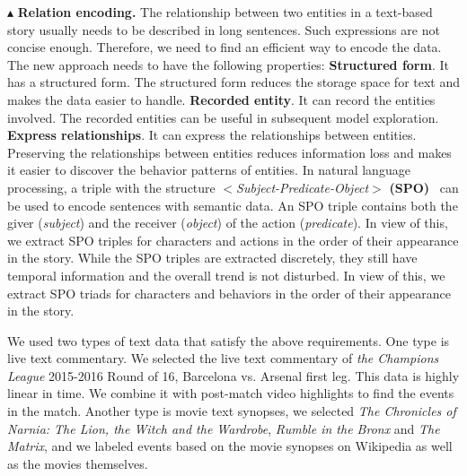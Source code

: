 \documentclass[review,journal]{vgtc}         %
\begin{document}
$\blacktriangle$ \textbf{Relation encoding.} The relationship between two entities in a text-based story usually needs to be described in long sentences. Such expressions are not concise enough. Therefore, we need to find an efficient way to encode the data. The new approach needs to have the following properties:  \textbf{Structured form}. It has a structured form. The structured form reduces the storage space for text and makes the data easier to handle.  \textbf{Recorded entity}. It can record the entities involved. The recorded entities can be useful in subsequent model exploration.  \textbf{Express relationships}. It can express the relationships between entities. Preserving the relationships between entities reduces information loss and makes it easier to discover the behavior patterns of entities. In natural language processing, a triple with the structure \textit{$<$Subject-Predicate-Object$>$} \textbf{(SPO)}~\cite{hoffart_yago2_2013} can be used to encode sentences with semantic data. An SPO triple contains both the giver (\textit{subject}) and the receiver (\textit{object}) of the action (\textit{predicate}). In view of this, we extract SPO triples for characters and actions in the order of their appearance in the story. While the SPO triples are extracted discretely, they still have temporal information and the overall trend is not disturbed. In view of this, we extract SPO triads for characters and behaviors in the order of their appearance in the story.

We used two types of text data that satisfy the above requirements. One type is live text commentary. We selected the live text commentary of \textit{the Champions League} 2015-2016 Round of 16, Barcelona vs. Arsenal first leg. This data is highly linear in time. We combine it with post-match video highlights to find the events in the match. Another type is movie text synopses, we selected \textit{The Chronicles of Narnia: The Lion, the Witch and the Wardrobe}, \textit{Rumble in the Bronx} and \textit{The Matrix}, and we labeled events based on the movie synopses on Wikipedia as well as the movies themselves.
\end{document}

